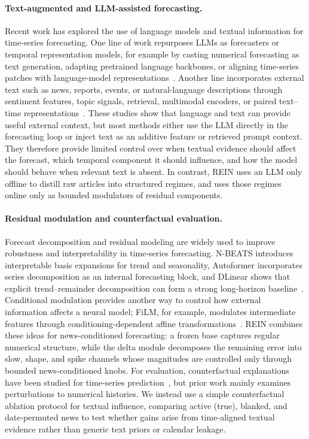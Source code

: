 \documentclass{article}
\newcommand{\method}{REIN\xspace}
\begin{document}
\paragraph{Text-augmented and LLM-assisted forecasting.}
Recent work has explored the use of language models and textual information for time-series forecasting. One line of work repurposes LLMs as forecasters or temporal representation models, for example by casting numerical forecasting as text generation, adapting pretrained language backbones, or aligning time-series patches with language-model representations~\citep{llmtime_gruver2024, zhou2023fitsallpowergeneraltime, timellm_jin2024}. Another line incorporates external text such as news, reports, events, or natural-language descriptions through sentiment features, topic signals, retrieval, multimodal encoders, or paired text--time representations~\citep{sentiment_finance_2020, rag_ts_2024, wang2026newsdriven}. These studies show that language and text can provide useful external context, but most methods either use the LLM directly in the forecasting loop or inject text as an additive feature or retrieved prompt context. They therefore provide limited control over when textual evidence should affect the forecast, which temporal component it should influence, and how the model should behave when relevant text is absent. In contrast, \method uses an LLM only offline to distill raw articles into structured regimes, and uses those regimes online only as bounded modulators of residual components.

\paragraph{Residual modulation and counterfactual evaluation.}
Forecast decomposition and residual modeling are widely used to improve robustness and interpretability in time-series forecasting. N-BEATS introduces interpretable basis expansions for trend and seasonality, Autoformer incorporates series decomposition as an internal forecasting block, and DLinear shows that explicit trend--remainder decomposition can form a strong long-horizon baseline~\citep{nbeats, autoformer, dlinear_zeng2023}. Conditional modulation provides another way to control how external information affects a neural model; FiLM, for example, modulates intermediate features through conditioning-dependent affine transformations~\citep{film}. \method combines these ideas for news-conditioned forecasting: a frozen base captures regular numerical structure, while the delta module decomposes the remaining error into slow, shape, and spike channels whose magnitudes are controlled only through bounded news-conditioned knobs. For evaluation, counterfactual explanations have been studied for time-series prediction~\citep{forecastcf, counts}, but prior work mainly examines perturbations to numerical histories. We instead use a simple counterfactual ablation protocol for textual influence, comparing active (true), blanked, and date-permuted news to test whether gains arise from time-aligned textual evidence rather than generic text priors or calendar leakage.
\end{document}
